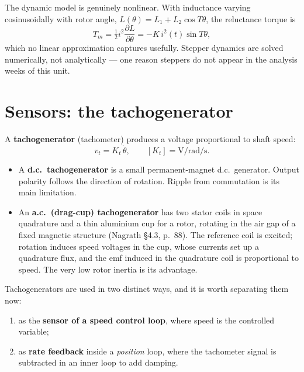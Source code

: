 \documentclass[11pt,a4paper]{article}
\begin{document}
The dynamic model is genuinely nonlinear. With inductance varying
cosinusoidally with rotor angle, $L(\theta)=L_1+L_2\cos T\theta$, the reluctance
torque is
\[
  T_m=\tfrac{1}{2}i^2\frac{\partial L}{\partial\theta}=-K\,i^2(t)\sin T\theta ,
\]
which no linear approximation captures usefully. Stepper dynamics are solved
numerically, not analytically --- one reason steppers do not appear in the
analysis weeks of this unit.

\section{Sensors: the tachogenerator}

A \textbf{tachogenerator} (tachometer) produces a voltage proportional to shaft
speed:
\begin{equation}
  v_t = K_t\,\dot\theta ,\qquad [K_t]=\si{\volt\per\radian\per\second}.
  \label{eq:tacho}
\end{equation}

\begin{itemize}[leftmargin=*]
\item A \textbf{d.c.\ tachogenerator} is a small permanent-magnet d.c.\
      generator. Output polarity follows the direction of rotation. Ripple from
      commutation is its main limitation.
\item An \textbf{a.c.\ (drag-cup) tachogenerator} has two stator coils in space
      quadrature and a thin aluminium cup for a rotor, rotating in the air gap
      of a fixed magnetic structure (Nagrath \S4.3, p.~88). The reference coil
      is excited; rotation induces speed voltages in the cup, whose currents
      set up a quadrature flux, and the emf induced in the quadrature coil is
      proportional to speed. The very low rotor inertia is its advantage.
\end{itemize}

Tachogenerators are used in two distinct ways, and it is worth separating them
now:

\begin{enumerate}[leftmargin=*]
\item as the \textbf{sensor of a speed control loop}, where speed is the
      controlled variable;
\item as \textbf{rate feedback} inside a \emph{position} loop, where the
      tachometer signal is subtracted in an inner loop to add damping.
\end{enumerate}
\end{document}
